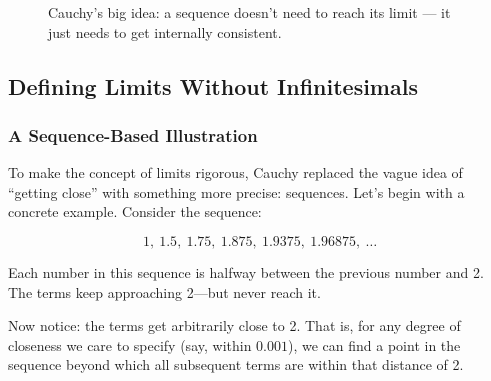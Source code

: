 \begin{figure}[H]
\centering
{}
\caption{Cauchy’s big idea: a sequence doesn’t need to reach its limit — it just needs to get internally consistent.}
\end{figure}



\subsection{Defining Limits Without Infinitesimals}

\subsubsection{A Sequence-Based Illustration}

To make the concept of limits rigorous, Cauchy replaced the vague idea of “getting close” with something more precise: sequences.  Let’s begin with a concrete example. Consider the sequence:

\[
1,\ 1.5,\ 1.75,\ 1.875,\ 1.9375,\ 1.96875,\ \dots
\]

Each number in this sequence is halfway between the previous number and 2. The terms keep approaching 2—but never reach it.

Now notice: the terms get arbitrarily close to 2. That is, for any degree of closeness we care to specify (say, within \(0.001\)), we can find a point in the sequence beyond which all subsequent terms are within that distance of 2.

